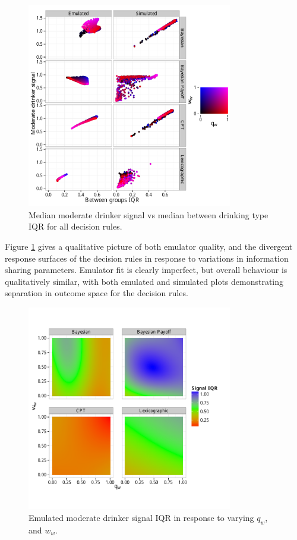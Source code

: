 \begin{figure}[H]
\begin{adjustbox}{center}\includegraphics[width=0.8\textwidth]{figures/sharing_emulated_simulated}\end{adjustbox}
\caption{Median moderate drinker signal vs median between drinking type IQR for all decision rules.}
\label{fig:outcome_plots}
\end{figure}

Figure \ref{fig:outcome_plots} gives a qualitative picture of both emulator quality, and the divergent response surfaces of the decision rules in response to variations in information sharing parameters. Emulator fit is clearly imperfect, but overall behaviour is qualitatively similar, with both emulated and simulated plots demonstrating separation in outcome space for the decision rules.

\begin{figure}[H]
\begin{adjustbox}{center}\includegraphics[width=0.8\textwidth]{figures/unfixed_emu_sig_iqr}\end{adjustbox}
\caption{Emulated moderate drinker signal IQR in response to varying \(q_{w}\), and \(w_{w}\).}
\label{fig:emulated_sharing_iqr}
\end{figure}

